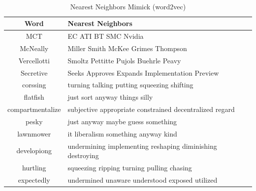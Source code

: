        \begin{table}[!h]
          \begin{center}
            \caption{Nearest Neighbors Mimick (word2vec)}
            ~\\
            \small
            \label{tab:nearest:lstm-word2vec}
            \begin{tabular}{c|l}
              \textbf{Word} & \textbf{Nearest Neighbors}\\
              \hline
              MCT & EC ATI BT SMC Nvidia\\
              McNeally & Miller Smith McKee Grimes Thompson\\
              Vercellotti & Smoltz Pettitte Pujols Buehrle Peavy\\
              Secretive & Seeks Approves Expands Implementation Preview\\
              corssing & turning talking putting squeezing shifting\\
              flatfish & just sort anyway things silly\\
              compartmentalize & subjective appropriate constrained decentralized regard\\
              pesky & just anyway maybe guess something\\
              lawnmower & it liberalism something anyway kind\\
              developiong & undermining implementing reshaping diminishing destroying\\
              hurtling & squeezing ripping turning pulling chasing\\
              expectedly & undermined unaware understood exposed utilized\\
            \end{tabular}
          \end{center}
        \end{table}

